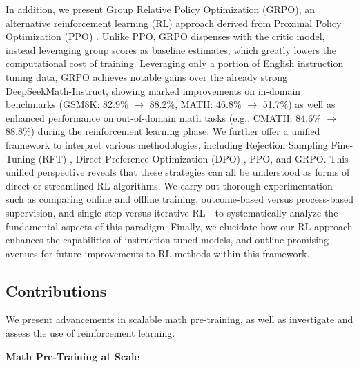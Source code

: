 In addition, we present Group Relative Policy Optimization (GRPO), an alternative reinforcement learning (RL) approach derived from Proximal Policy Optimization (PPO) \citep{schulman2017proximal}. Unlike PPO, GRPO dispenses with the critic model, instead leveraging group scores as baseline estimates, which greatly lowers the computational cost of training. Leveraging only a portion of English instruction tuning data, GRPO achieves notable gains over the already strong DeepSeekMath-Instruct, showing marked improvements on in-domain benchmarks (GSM8K: 82.9\% $\rightarrow$ 88.2\%, MATH: 46.8\% $\rightarrow$ 51.7\%) as well as enhanced performance on out-of-domain math tasks (e.g., CMATH: 84.6\% $\rightarrow$ 88.8\%) during the reinforcement learning phase. We further offer a unified framework to interpret various methodologies, including Rejection Sampling Fine-Tuning (RFT) \citep{yuan2023scaling}, Direct Preference Optimization (DPO) \citep{dpo}, PPO, and GRPO. This unified perspective reveals that these strategies can all be understood as forms of direct or streamlined RL algorithms. We carry out thorough experimentation—such as comparing online and offline training, outcome-based versus process-based supervision, and single-step versus iterative RL—to systematically analyze the fundamental aspects of this paradigm. Finally, we elucidate how our RL approach enhances the capabilities of instruction-tuned models, and outline promising avenues for future improvements to RL methods within this framework.

\subsection{Contributions}
We present advancements in scalable math pre-training, as well as investigate and assess the use of reinforcement learning.

\textbf{Math Pre-Training at Scale}

